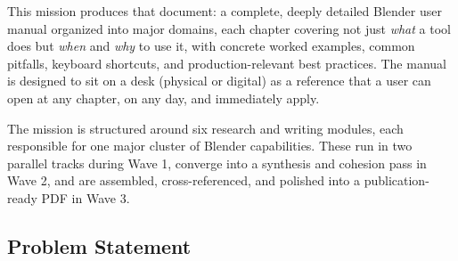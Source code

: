 \documentclass[11pt,letterpaper]{article}
\begin{document}
This mission produces that document: a complete, deeply detailed Blender user manual organized into major domains, each chapter covering not just \textit{what} a tool does but \textit{when} and \textit{why} to use it, with concrete worked examples, common pitfalls, keyboard shortcuts, and production-relevant best practices. The manual is designed to sit on a desk (physical or digital) as a reference that a user can open at any chapter, on any day, and immediately apply.

The mission is structured around six research and writing modules, each responsible for one major cluster of Blender capabilities. These run in two parallel tracks during Wave 1, converge into a synthesis and cohesion pass in Wave 2, and are assembled, cross-referenced, and polished into a publication-ready PDF in Wave 3.

\subsection{Problem Statement}
\end{document}

